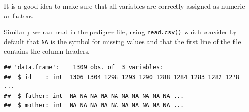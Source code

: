 \documentclass[
  12pt,
]{book}
\newenvironment{Shaded}{\begin{snugshade}}{\end{snugshade}}
\newcommand{\FunctionTok}[1]{\textcolor[rgb]{0.00,0.00,0.00}{#1}}
\newcommand{\NormalTok}[1]{#1}
\newcommand{\OtherTok}[1]{\textcolor[rgb]{0.56,0.35,0.01}{#1}}
\newcommand{\SpecialCharTok}[1]{\textcolor[rgb]{0.00,0.00,0.00}{#1}}
\begin{document}
It is a good idea to make sure that all variables are correctly assigned as numeric or factors:

\begin{Shaded}
\end{Shaded}

Similarly we can read in the pedigree file, using \texttt{read.csv()} which consider by default that \texttt{NA} is the symbol for missing values and that the first line of the file contains the column headers.

\begin{verbatim}
## 'data.frame':    1309 obs. of  3 variables:
##  $ id    : int  1306 1304 1298 1293 1290 1288 1284 1283 1282 1278 ...
##  $ father: int  NA NA NA NA NA NA NA NA NA NA ...
##  $ mother: int  NA NA NA NA NA NA NA NA NA NA ...
\end{verbatim}

\begin{Shaded}
\end{Shaded}
\end{document}
